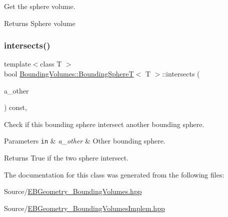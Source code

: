 Get the sphere volume. 

\begin{DoxyReturn}{Returns}
Sphere volume 
\end{DoxyReturn}
\mbox{\label{classBoundingVolumes_1_1BoundingSphereT_a90baad0c400aac7645a7e8c1ab13096a}} 
\subsubsection{\texorpdfstring{intersects()}{intersects()}}
{\footnotesize\ttfamily template$<$class T $>$ \\
bool \hyperlink{classBoundingVolumes_1_1BoundingSphereT}{Bounding\+Volumes\+::\+Bounding\+SphereT}$<$ T $>$\+::intersects (\begin{DoxyParamCaption}\item[{const \hyperlink{classBoundingVolumes_1_1BoundingSphereT}{Bounding\+SphereT}$<$ T $>$ \&}]{a\+\_\+other }\end{DoxyParamCaption}) const\hspace{0.3cm}{\ttfamily [inline]}, {\ttfamily [noexcept]}}



Check if this bounding sphere intersect another bounding sphere. 


\begin{DoxyParams}[1]{Parameters}
\mbox{\tt in}  & {\em a\+\_\+other} & Other bounding sphere. \\
\hline
\end{DoxyParams}
\begin{DoxyReturn}{Returns}
True if the two sphere intersect. 
\end{DoxyReturn}


The documentation for this class was generated from the following files\+:\begin{DoxyCompactItemize}
\item 
Source/\hyperlink{EBGeometry__BoundingVolumes_8hpp}{E\+B\+Geometry\+\_\+\+Bounding\+Volumes.\+hpp}\item 
Source/\hyperlink{EBGeometry__BoundingVolumesImplem_8hpp}{E\+B\+Geometry\+\_\+\+Bounding\+Volumes\+Implem.\+hpp}\end{DoxyCompactItemize}
